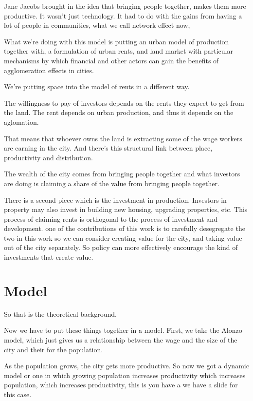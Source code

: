 \documentclass[]{article}
\begin{document}
Jane Jacobs brought in the idea that bringing people together, makes them more productive. It wasn't just technology. It had to do with the gains from having a lot of people in communities,  what we call  network effect now,


What we're doing with this model is putting an urban model of production together with, a formulation of urban rents, and land market with particular mechanisms by which financial and other actors can gain the benefits of agglomeration effects in cities. 

We're putting space into the model of rents in a different way. 

The willingness to pay of investors depends on the rents they expect to get from the land.
 The rent depends on urban production, and thus it depends on the aglomation. 
 
That means that whoever owns the land is extracting some of the wage workers are earning in the city.
And there's this structural link between place, productivity and distribution. 

The wealth of the city comes from bringing people together and  what investors are doing is  claiming a share of the value from bringing people together. 

There is a second piece which is the investment in production. Investors in property may also invest in building new housing, upgrading properties, etc. 
This process of claiming rents  is orthogonal to the process of investment and development.
one of the contributions of this work is to carefully desegregate the two in this work so we can consider creating value for the city, and taking value out of the city separately. 
So policy can more effectively encourage the kind of investments that create value. 


\section{Model}

So that is the theoretical background.

Now we have to put these things together in a model.
First, we take the Alonzo model, which just gives us a relationship between the wage and the size of the city and their for the population.

As the population grows, the city gets more productive. So now we got a dynamic model or one in which growing population increases productivity which increases population, which increases productivity, this is you have a we have a slide for this case.
\end{document}
